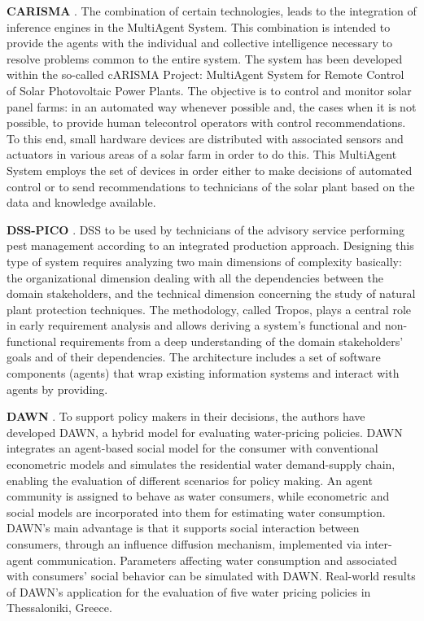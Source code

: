 \documentclass[letterpaper, 10 pt, conference]{ieeeconf}  %
\begin{document}
\textbf{CARISMA} \cite{Oviedo2014}. The combination of certain technologies, leads to the integration of inference engines in the MultiAgent System. This combination is intended to provide the agents with the individual and collective intelligence necessary to resolve problems common to the entire system. The system has been developed within the so-called cARISMA Project: MultiAgent System for Remote Control of Solar Photovoltaic Power Plants. The objective is to control and monitor solar panel farms: in an automated way whenever possible and, the cases when it is not possible, to provide human telecontrol operators with control recommendations. To this end, small hardware devices are distributed with associated sensors and actuators in various areas of a solar farm in order to do this. This MultiAgent System employs the set of devices in order either to make decisions of automated control or to send recommendations to technicians of the solar plant based on the data and knowledge available.

\textbf{DSS-PICO} \cite{perini2004developing}. DSS to be used by technicians of the advisory service performing pest management according to an integrated production approach. Designing this type of system requires analyzing two main dimensions of complexity basically: the organizational dimension dealing with all the dependencies between the domain stakeholders, and the technical dimension concerning the study of natural plant protection techniques. The methodology, called Tropos, plays a central role in early requirement analysis and allows deriving a system’s functional and non-functional requirements from a deep understanding of the domain stakeholders’ goals and of their dependencies. The architecture includes a set of software components (agents) that wrap existing information systems and interact with agents by providing.


\textbf{DAWN} \cite{athanasiadis2005hybrid}. To support policy makers in their decisions, the authors have developed DAWN, a hybrid
model for evaluating water-pricing policies. DAWN integrates an agent-based social model for the consumer with conventional econometric models and simulates the residential water demand-supply chain, enabling the evaluation of different scenarios for policy making. An agent community is assigned to behave as water consumers, while econometric and social models are incorporated into them for estimating water consumption. DAWN’s main advantage is that it supports social interaction between consumers, through an influence diffusion mechanism, implemented via inter-agent communication. Parameters affecting water consumption and associated with consumers’ social behavior can be simulated with DAWN. Real-world results of DAWN’s application for the evaluation of five water pricing policies in Thessaloniki, Greece.
\end{document}
